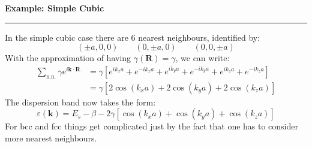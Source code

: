 \documentclass[10.75pt,a4paper,openright,bottom=2cm]{article}
\renewcommand{\Vec}[1]{\boldsymbol{#1}}
\begin{document}
\begin{mybox}
\textbf{Example: Simple Cubic} 
\hrule
\vspace{0.2cm}
In the simple cubic case there are 6 nearest neighbours, identified by:
\[
(\pm a,0,0) \qquad (0,\pm a,0) \qquad (0,0,\pm a)
\]
With the approximation of having $\gamma(\Vec{R})=\gamma$, we can write:
\begin{align*}
\sum_{\text{n.n.}}\gamma e^{i\Vec{k}\cdot\Vec{R}}&=\gamma\left[e^{ik_xa}+e^{-ik_xa}+e^{ik_ya}+e^{-ik_ya}+e^{ik_za}+e^{-ik_za}\right]\\
&=\gamma\left[2\cos(k_xa)+2\cos(k_ya)+2\cos(k_za)\right]
\end{align*}
The dispersion band now takes the form:
\[
\varepsilon(\Vec{k})=E_s-\beta-2\gamma\left[\cos(k_xa)+\cos(k_ya)+\cos(k_za)\right]
\]
For bcc and fcc things get complicated just by the fact that one has to consider more nearest neighbours.
\end{mybox}
\end{document}
